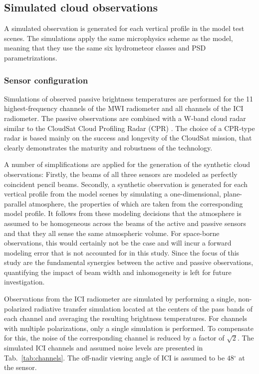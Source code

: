 \documentclass[journal abbreviation, manuscript]{copernicus}
\begin{document}
\subsection{Simulated cloud observations}

A simulated observation is generated for each vertical profile in the
model test scenes. The simulations apply the same microphysics scheme
as the model, meaning that they use the same six hydrometeor classes
and PSD parametrizations.

\subsubsection{Sensor configuration}
\label{sec:sensors}

Simulations of observed passive brightness temperatures are performed for the 11
highest-frequency channels of the MWI radiometer and all channels of the ICI
radiometer. The passive observations are combined with a W-band cloud radar
similar to the CloudSat Cloud Profiling Radar (CPR)
\citep{stephens02,tanelli08}. The choice of a CPR-type radar is based mainly on
the success and longevity of the CloudSat mission, that clearly demonstrates the
maturity and robustness of the technology.

A number of simplifications are applied for the generation of the synthetic
cloud observations: Firstly, the beams of all three sensors are modeled as
perfectly coincident pencil beams. Secondly, a synthetic observation is
generated for each vertical profile from the model scenes by simulating a
one-dimensional, plane-parallel atmosphere, the properties of which are taken
from the corresponding model profile. It follows from these modeling decisions
that the atmosphere is assumed to be homogeneous across the beams of the active
and passive sensors and that they all sense the same atmospheric volume. For
space-borne observations, this would certainly not be the case and will incur a
forward modeling error that is not accounted for in this study. Since the
 focus of this study are the fundamental synergies between the active and passive
 observations, quantifying the impact of beam width and inhomogeneity is left
 for future investigation.

Observations from the ICI radiometer are simulated by performing a single,
non-polarized radiative transfer simulation located at the centers of the pass
bands of each channel and averaging the resulting brightness temperatures. For
channels with multiple polarizations, only a single simulation is performed.
To compensate for this, the noise of the corresponding channel is reduced by a
factor of $\sqrt{2}$. The simulated ICI channels and assumed noise levels are
presented in  Tab.~\ref{tab:channels}. The off-nadir viewing angle of ICI
is assumed to be $48\unit{^\circ}$ at the sensor.
\end{document}
